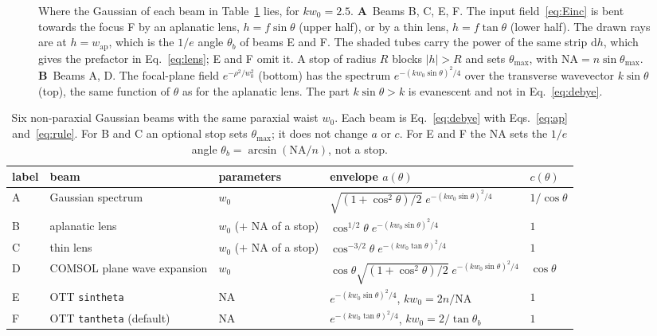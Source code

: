 \documentclass[
	aps,
	pra,
	reprint,
	amsmath,
	amssymb,
	superscriptaddress,
	nofootinbib
]{revtex4-2}
\begin{document}
\begin{figure}[t]
\begin{tikzpicture}[>=Latex, font=\footnotesize, scale=0.8, baseline=(current bounding box.north),
                    dim/.style={<->, thin}]
\end{tikzpicture}
\caption{Where the Gaussian of each beam in Table~\ref{tab:env} lies, for $kw_0=2.5$.
\textsf{\textbf{A}}~Beams B, C, E, F. The input field~\eqref{eq:Einc} is bent towards the focus F by an aplanatic lens, $h=f\sin\theta$ (upper half), or by a thin lens, $h=f\tan\theta$ (lower half). The drawn rays are at $h=w_\mathrm{ap}$, which is the $1/e$ angle $\theta_b$ of beams E and F. The shaded tubes carry the power of the same strip $\mathrm{d}h$, which gives the prefactor in Eq.~\eqref{eq:lens}; E and F omit it. A stop of radius $R$ blocks $|h|>R$ and sets $\theta_{\max}$, with $\mathrm{NA}=n\sin\theta_{\max}$.
\textsf{\textbf{B}}~Beams A, D. The focal-plane field $e^{-\rho^2/w_0^2}$ (bottom) has the spectrum $e^{-(kw_0\sin\theta)^2/4}$ over the transverse wavevector $k\sin\theta$ (top), the same function of $\theta$ as for the aplanatic lens. The part $k\sin\theta>k$ is evanescent and not in Eq.~\eqref{eq:debye}.}
\label{fig:constructions}
\end{figure}

\begin{table}[t]
    \caption{Six non-paraxial Gaussian beams with the same paraxial waist $w_0$. Each beam is Eq.~\eqref{eq:debye} with Eqs.~\eqref{eq:ap} and~\eqref{eq:rule}. For B and C an optional stop sets $\theta_{\max}$; it does not change $a$ or $c$. For E and F the NA sets the $1/e$ angle $\theta_b=\arcsin(\mathrm{NA}/n)$, not a stop.}
    \label{tab:env}
    \begin{tabular*}{\textwidth}{@{\extracolsep{\fill}}lllll@{}}
        \toprule
        label & beam & parameters & envelope $a(\theta)$ & $c(\theta)$\\
        \midrule
        A & Gaussian spectrum & $w_0$ & $\sqrt{(1+\cos^2\theta)/2}\;e^{-(kw_0\sin\theta)^2 / 4}$ & $1/\cos\theta$\\
        B & aplanatic lens & $w_0$ ($+$ NA of a stop) & $\cos^{1/2}\theta\;e^{-(kw_0\sin\theta)^2/4}$ & $1$\\
        C & thin lens & $w_0$ ($+$ NA of a stop) & $\cos^{-3/2}\theta\;e^{-(kw_0\tan\theta)^2/4}$ & $1$\\
        D & COMSOL plane wave expansion & $w_0$ & $\cos\theta\sqrt{(1+\cos^2\theta)/2}\;e^{-(kw_0\sin\theta)^2/4}$ & $\cos\theta$\\
        E & OTT \texttt{sintheta} & NA & $e^{-(kw_0\sin\theta)^2/4}$, $kw_0=2n/\mathrm{NA}$ & $1$\\
        F & OTT \texttt{tantheta} (default) & NA & $e^{-(kw_0\tan\theta)^2/4}$, $kw_0=2/\tan\theta_b$ & $1$\\
        \bottomrule
    \end{tabular*}
\end{table}
\end{document}
